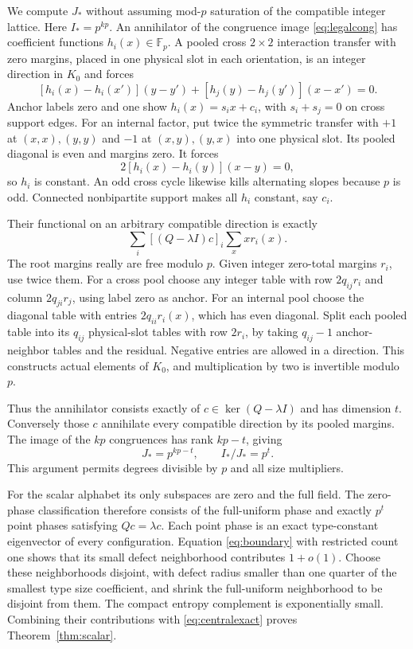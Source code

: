 \documentclass[11pt]{article}
\newcommand{\Fp}{\mathbb F_p}
\begin{document}
We compute $J_*$ without assuming mod-$p$ saturation of the compatible integer lattice. Here $I_*=p^{kp}$. An annihilator of the congruence image \eqref{eq:legalcong} has coefficient functions $h_i(x)\in\Fp$. A pooled cross $2\times2$ interaction transfer with zero margins, placed in one physical slot in each orientation, is an integer direction in $K_0$ and forces
\[
 [h_i(x)-h_i(x')](y-y')+[h_j(y)-h_j(y')](x-x')=0.
\]
Anchor labels zero and one show $h_i(x)=s_ix+c_i$, with $s_i+s_j=0$ on cross support edges. For an internal factor, put twice the symmetric transfer with $+1$ at $(x,x),(y,y)$ and $-1$ at $(x,y),(y,x)$ into one physical slot. Its pooled diagonal is even and margins zero. It forces
\[
 2[h_i(x)-h_i(y)](x-y)=0,
\]
so $h_i$ is constant. An odd cross cycle likewise kills alternating slopes because $p$ is odd. Connected nonbipartite support makes all $h_i$ constant, say $c_i$.

Their functional on an arbitrary compatible direction is exactly
\[
 \sum_i[(Q-\lambda I)c]_i\sum_x x r_i(x).
\]
The root margins really are free modulo $p$. Given integer zero-total margins $r_i$, use twice them. For a cross pool choose any integer table with row $2q_{ij}r_i$ and column $2q_{ji}r_j$, using label zero as anchor. For an internal pool choose the diagonal table with entries $2q_{ii}r_i(x)$, which has even diagonal. Split each pooled table into its $q_{ij}$ physical-slot tables with row $2r_i$, by taking $q_{ij}-1$ anchor-neighbor tables and the residual. Negative entries are allowed in a direction. This constructs actual elements of $K_0$, and multiplication by two is invertible modulo $p$.

Thus the annihilator consists exactly of $c\in\ker(Q-\lambda I)$ and has dimension $t$. Conversely those $c$ annihilate every compatible direction by its pooled margins. The image of the $kp$ congruences has rank $kp-t$, giving
\[
 J_*=p^{kp-t},\qquad I_*/J_*=p^t.
\]
This argument permits degrees divisible by $p$ and all size multipliers.

For the scalar alphabet its only subspaces are zero and the full field. The zero-phase classification therefore consists of the full-uniform phase and exactly $p^t$ point phases satisfying $Qc=\lambda c$. Each point phase is an exact type-constant eigenvector of every configuration. Equation \eqref{eq:boundary} with restricted count one shows that its small defect neighborhood contributes $1+o(1)$. Choose these neighborhoods disjoint, with defect radius smaller than one quarter of the smallest type size coefficient, and shrink the full-uniform neighborhood to be disjoint from them. The compact entropy complement is exponentially small. Combining their contributions with \eqref{eq:centralexact} proves Theorem~\ref{thm:scalar}.
\end{document}

